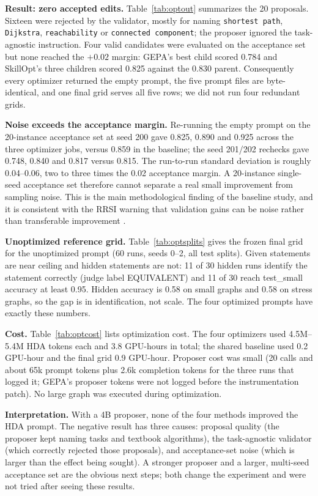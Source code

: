 \documentclass[10pt]{article}
\begin{document}
\textbf{Result: zero accepted edits.} Table~\ref{tab:optout} summarizes the 20
proposals. Sixteen were rejected by the validator, mostly for naming
\texttt{shortest path}, \texttt{Dijkstra}, \texttt{reachability} or
\texttt{connected component}; the proposer ignored the task-agnostic
instruction. Four valid candidates were evaluated on the acceptance set but
none reached the $+0.02$ margin: GEPA's best child scored 0.784 and SkillOpt's
three children scored 0.825 against the 0.830 parent. Consequently every
optimizer returned the empty prompt, the five prompt files are byte-identical,
and one final grid serves all five rows; we did not run four redundant grids.

\textbf{Noise exceeds the acceptance margin.} Re-running the empty prompt on
the 20-instance acceptance set at seed 200 gave 0.825, 0.890 and 0.925 across
the three optimizer jobs, versus 0.859 in the baseline; the seed 201/202
rechecks gave 0.748, 0.840 and 0.817 versus 0.815. The run-to-run standard
deviation is roughly 0.04--0.06, two to three times the 0.02 acceptance margin.
A 20-instance single-seed acceptance set therefore cannot separate a real small
improvement from sampling noise. This is the main methodological finding of the
baseline study, and it is consistent with the RRSI warning that validation
gains can be noise rather than transferable improvement \cite{rrsi}.

\textbf{Unoptimized reference grid.} Table~\ref{tab:optsplits} gives the frozen
final grid for the unoptimized prompt (60 runs, seeds 0--2, all test splits).
Given statements are near ceiling and hidden statements are not: 11 of 30
hidden runs identify the statement correctly (judge label EQUIVALENT) and 11 of
30 reach test\_small accuracy at least 0.95. Hidden accuracy is 0.58 on small
graphs and 0.58 on stress graphs, so the gap is in identification, not scale.
The four optimized prompts have exactly these numbers.

\textbf{Cost.} Table~\ref{tab:optcost} lists optimization cost. The four
optimizers used 4.5M--5.4M HDA tokens each and 3.8 GPU-hours in total; the
shared baseline used 0.2 GPU-hour and the final grid 0.9 GPU-hour. Proposer
cost was small (20 calls and about 65k prompt tokens plus 2.6k completion
tokens for the three runs that logged it; GEPA's proposer tokens were not
logged before the instrumentation patch). No large graph was executed during
optimization.

\textbf{Interpretation.} With a 4B proposer, none of the four methods improved
the HDA prompt. The negative result has three causes: proposal quality (the
proposer kept naming tasks and textbook algorithms), the task-agnostic
validator (which correctly rejected those proposals), and acceptance-set noise
(which is larger than the effect being sought). A stronger proposer and a
larger, multi-seed acceptance set are the obvious next steps; both change the
experiment and were not tried after seeing these results.
\end{document}
